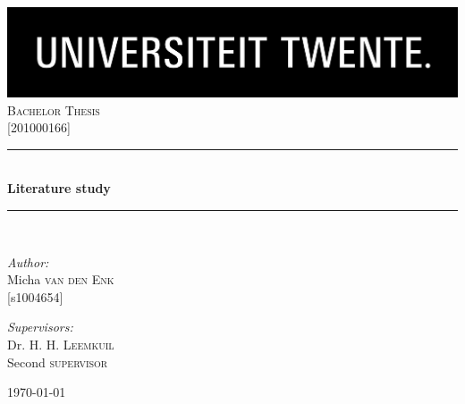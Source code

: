\documentclass[11pt,twoside]{report} %
\newcommand{\HRule}{\rule{\linewidth}{0.5mm}}
\newcommand\blankpage{%
    \null
    \thispagestyle{empty}%
    \newpage}
\begin{document}
\begin{titlepage}

\begin{center}


\includegraphics[width=1\textwidth]{./logo}\\[1cm]    

\textsc{\Large Bachelor Thesis}\\[0.5cm]
\textsc{\Large {[}201000166{]}}\\[0.5cm]


\HRule \\[0.4cm]
{ \huge \bfseries Literature study}\\[0.4cm]

\HRule \\[1.5cm]

\begin{minipage}{0.4\textwidth}
\begin{flushleft} \large
\emph{Author:}\\
Micha \textsc{van den Enk} \\
{[}s1004654{]} \\
\end{flushleft}
\end{minipage}
\begin{minipage}{0.4\textwidth}
\begin{flushright} \large
\emph{Supervisors:} \\
Dr. H. H. \textsc{Leemkuil} \\
Second \textsc{supervisor} \\
\end{flushright}
\end{minipage}

\vfill

{\large \today}

\end{center}

\end{titlepage}

\afterpage{\blankpage}

\setcounter{tocdepth}{1}
\tableofcontents
\thispagestyle{fancy}
\newpage
\end{document}
